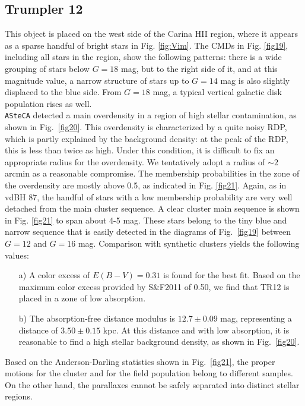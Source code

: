 \documentclass[draft]{aa}
\begin{document}
\subsection{Trumpler 12}

This object is placed on the west side of the Carina HII region, where it appears
as a sparse handful of bright stars in Fig. \ref{fig:Vim}. The CMDs in Fig.
\ref{fig19}, including all stars in the region, show the following patterns:
there is a wide grouping of stars below $G=18$ mag, but to the right side of
it, and at this magnitude value, a narrow structure of stars up to $G=14$
mag is also slightly displaced to the blue side. From $G=18$ mag, a typical
vertical galactic disk population rises as well.\\

\texttt{ASteCA} detected a main overdensity in a region of high
stellar contamination, as shown in Fig.~\ref{fig20}.
This overdensity is characterized by a quite noisy RDP, which is partly
explained by the background density: at the peak of the RDP, this is
less than twice as high.
Under this condition, it is difficult to fix an appropriate
radius for the overdensity. We tentatively adopt a radius of $\sim2$ arcmin as a
reasonable compromise.
The membership probabilities in the zone of the overdensity are mostly
above 0.5, as indicated in Fig. \ref{fig21}. Again, as in vdBH 87, the
handful of stars with a low membership probability are very well detached from the main
cluster sequence.
%
A clear cluster main sequence is shown in Fig. \ref{fig21} to span about
4-5 mag. These stars belong to the tiny blue and narrow sequence that is
easily detected in the diagrams of Fig.~\ref{fig19} between $G=12$ and $G=16$
mag. Comparison with synthetic clusters yields the following values:

\begin{itemize}
\item [a)] A color excess of $E(B-V)=0.31$ is found for the best fit.
    Based on the maximum color excess provided by S\&F2011 of 0.50, we find that
    TR12 is placed in a zone of low absorption.
\item [b)] The absorption-free distance modulus is $12.7\pm0.09$ mag,
representing a distance of $3.50\pm0.15$ kpc. At this distance and with
low absorption, it is reasonable to find a high stellar background density,
as shown in Fig.~\ref{fig20}.
\end{itemize}

Based on the Anderson-Darling statistics shown in Fig.~\ref{fig21}, the
proper motions for the cluster and for the field population belong to different
samples. On the other hand, the parallaxes cannot be safely separated into
distinct stellar regions.\\
\end{document}
